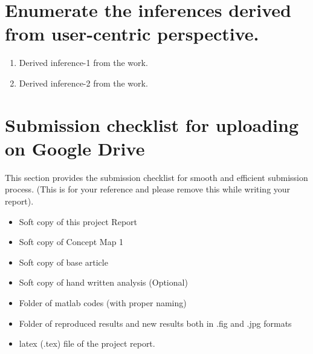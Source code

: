 \documentclass{article}
\begin{document}
\section{Enumerate the inferences derived from user-centric perspective.}
	
\begin{enumerate}
\item Derived inference-1 from the work. 
\item Derived inference-2 from the work. 
\end{enumerate} 




\section*{Submission checklist for uploading on Google Drive}
This section provides the submission checklist for smooth and efficient submission process.  (This is for your reference and please remove this while writing your report).  
\begin{itemize}

\item Soft copy of this project Report
\item Soft copy of Concept Map 1
\item Soft copy of base article
\item Soft copy of hand written analysis (Optional)
\item Folder of matlab codes (with proper naming)
\item Folder of reproduced results and new results both in .fig and .jpg formats
\item latex (.tex) file of the project report.
\end{itemize}






\end{document}
